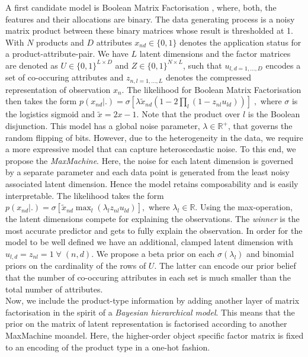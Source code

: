 \documentclass{article}
\begin{document}
A first candidate model is Boolean Matrix 
Factorisation \cite{Rukat2017},
where, both, the features and their allocations are
binary. The data generating process is a noisy matrix product between these
binary matrices whose result is thresholded at 1. With \(N\) products and \(D\)
attributes \(x_{nd} \in \{0,1\}\) denotes the application status for
a product-attribute-pair. We have $L$ latent dimensions and the factor matrices
are denoted as \(U \in \{0,1\}^{L\times D}\) and \(Z \in
  \{0,1\}^{N\times L}\), such that \(u_{l,d=1,\ldots, D}\) encodes a set
of co-occuring attributes and \(z_{n, l=1,\ldots,L}\) denotes the
compressed representation of observation \(x_n\). The likelihood for
Boolean Matrix Factorisation then takes the form $ p(x_{nd}|.) = \sigma[\lambda \tilde{x}_{nd} (1-2 \prod_{l}(1-z_{nl}u_{ld}) ) ]\;, $
where $\sigma$ is the logistics sigmoid and $\tilde{x} = 2x{-}1$. Note that the product over \(l\) is the Boolean disjunction. This model has a global noise
parameter, $\lambda \in \mathbb{R}^+$, that governs the random
flipping of bits. However, due to the heterogeneity in the data, we require a more expressive model
that can capture heteroscedastic noise. To this end, we propose the
\emph{MaxMachine}. Here, the noise for each latent dimension is
governed by a separate parameter and each data point is generated from
the least noisy associated latent dimension. Hence the model retains
composability and is easily interpretable.
The likelihood takes the form
$  p(x_{nd}|.) = \sigma\left[\tilde{x}_{nd} \max_l (\lambda_l z_{nl} u_{ld})\right],$
where $\lambda_l \in \mathbb{R}$.
Using the max-operation, the latent dimensions compete for
explaining the observations. The \emph{winner} is 
the most accurate predictor and gets to fully explain the
observation. In order for the model to be well defined we have an
additional, clamped latent dimension with \(u_{l,d}{=}z_{nl}{=}1 \;\forall\;(n,d)\).
We propose a beta prior on each $\sigma(\lambda_l)$ and binomial priors on the cardinality of the rows of $U$. The latter can encode our prior belief that the number of co-occuring attributes in each set is much smaller than the total number of attributes.\\
Now, we include the product-type information by adding another layer of
matrix factorisation in the spirit of a \textit{Bayesian hierarchical model}.
This means that the prior on the matrix of latent representation is
factorised according to another MaxMachine moandel. Here, the
higher-order object specific factor matrix is fixed to an encoding of the product type
in a one-hot fashion.
\end{document}
